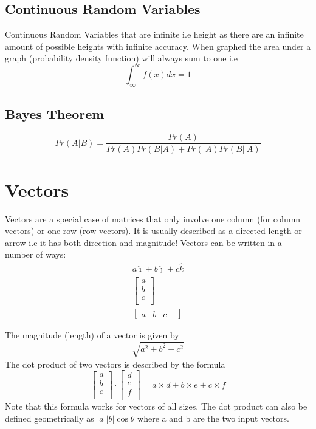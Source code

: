 \documentclass[12pt] {article}
\begin{document}
\subsection*{Continuous Random Variables}
Continuous Random Variables that are infinite i.e height as there are an infinite amount 
of possible heights with infinite accuracy. When graphed the area under a graph (probability density function)
will always sum to one i.e
\begin{equation*}
  \int_\infty^\infty f(x)dx = 1 
\end{equation*}
\subsection*{Bayes Theorem}
\begin{equation*}
  Pr(A \vert B) = \frac{Pr(A)}{Pr(A)Pr(B \vert A) + Pr(~A)Pr(B \vert ~A)}
\end{equation*}

\section{Vectors}
Vectors are a special case of matrices that only involve one column (for column vectors)
or one row (row vectors). It is usually described as a directed length or arrow i.e 
it has both direction and magnitude! Vectors can be written in a number of ways:
\begin{gather*}
  a\hat{\imath} + b\hat{\jmath} + c\hat{k} \\
  \begin{bmatrix} 
    a \\
    b \\ 
    c \\
  \end{bmatrix} \\
  \begin{bmatrix}
    a &
    b & 
    c &
  \end{bmatrix} 
\end{gather*}

The magnitude (length) of a vector is given by 
\begin{equation*}
  \sqrt{a^2+b^2+c^2}
\end{equation*}
The dot product of two vectors is described by the formula
\begin{equation*}
  \begin{bmatrix}
    a \\
    b \\ 
    c \\
  \end{bmatrix} \cdot
  \begin{bmatrix}
    d \\
    e \\ 
    f \\
  \end{bmatrix}
  = a\times d + b\times e + c \times f 
\end{equation*}
Note that this formula works for vectors of all sizes. The dot product can also be defined 
geometrically as $|a||b|\cos\theta$ where a and b are the two input vectors.
\end{document}
